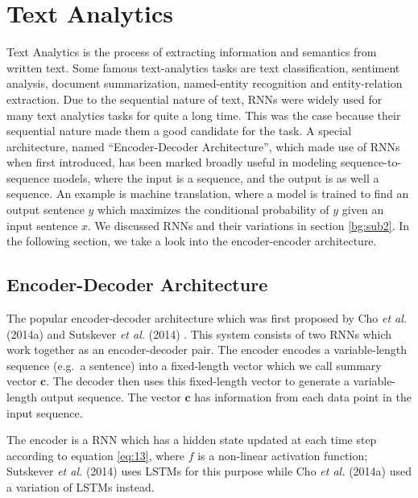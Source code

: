
\section{Text Analytics} \label{bg:s4}

Text Analytics is the process of extracting information and semantics from written text. Some famous text-analytics tasks are text classification, sentiment analysis, document summarization, named-entity recognition and entity-relation extraction. Due to the sequential nature of text, \ac{RNN}s were widely used for many text analytics tasks for quite a long time. This was the case because their sequential nature made them a good candidate for the task. A special architecture, named \enquote{Encoder-Decoder Architecture}, which made use of \ac{RNN}s when first introduced, has been marked broadly useful in modeling sequence-to-sequence models, where the input is a sequence, and the output is as well a sequence. An example is machine translation, where a model is trained to find an output sentence $y$ which maximizes the conditional probability of $y$ given an input sentence $x$. We discussed \ac{RNN}s and their variations in section \ref{bg:sub2}. In the following section, we take a look into the encoder-encoder architecture.

\subsection{Encoder-Decoder Architecture} 
\label{bg:sub8}

The popular encoder-decoder architecture which was first proposed by Cho \textit{et al.} (2014a) \cite{cho2014learning} and Sutskever \textit{et al.} (2014) \cite{sutskever2014sequence}. This system consists of two \ac{RNNs} which work together as an encoder-decoder pair. The encoder encodes a variable-length sequence (e.g.\ a sentence) into a fixed-length vector which we call summary vector $ \mathbf{c} $. The decoder then uses this fixed-length vector to generate a variable-length output sequence. The vector $ \mathbf{c} $ has information from each data point in the input sequence.

The encoder is a \ac{RNN} which has a hidden state updated at each time step according to equation \ref{eq:13}, where $f$ is a non-linear activation function;  Sutskever \textit{et al.} (2014) \cite{sutskever2014sequence} uses \ac{LSTM}s for this purpose while Cho \textit{et al.} (2014a) \cite{cho2014learning} used a variation of \ac{LSTM}s instead.

